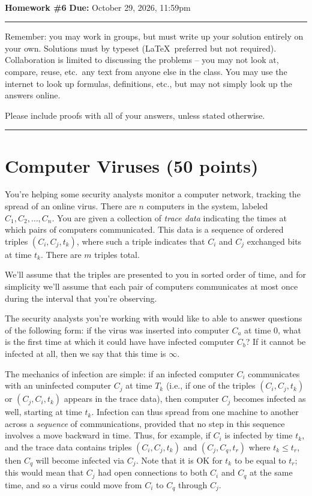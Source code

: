\documentclass[11pt]{article}
\begin{document}
\\ 
{{\bf Homework \#6}} \hfill {{\bf Due:} October 29, 2026, 11:59pm} \\
\rule[0.1in]{\textwidth}{0.4pt}

Remember: you may work in groups, but must write up your solution entirely on your own.  Solutions must by typeset (\LaTeX\ preferred but not required).  Collaboration is limited to discussing the problems -- you may not look at, compare, reuse, etc.~any text from anyone else in the class.  You may use the internet to look up formulas, definitions, etc., but may not simply look up the answers online.  

Please include proofs with all of your answers, unless stated otherwise.

\noindent \rule[0.1in]{\textwidth}{0.4pt}

\section{Computer Viruses (50 points)}
    You're helping some security analysts monitor a computer network, tracking the spread of an online virus.
    There are $n$ computers in the system, labeled $C_1, C_2, \dots, C_n$.  You are given a collection of
    \emph{trace data} indicating the times at which pairs of computers communicated.  This data is a 
    sequence of ordered triples $(C_i, C_j, t_k)$, where such a triple indicates that $C_i$ and $C_j$
    exchanged bits at time $t_k$.  There are $m$ triples total.

    We'll assume that the triples are presented to you in sorted order of time, and for simplicity we'll 
    assume that each pair of computers communicates at most once during the interval that you're observing.  

    The security analysts you're working with would like to able to answer questions of the following form:
    if the virus was inserted into computer $C_a$ at time $0$, what is the first time at which it could have
    have infected computer $C_b$?  If it cannot be infected at all, then we say that this time is $\infty$.  

    The mechanics of infection are simple: if an infected computer $C_i$ communicates with an uninfected
    computer $C_j$ at time $T_k$ (i.e., if one of the triples $(C_i, C_j, t_k)$ or $(C_j, C_i, t_k)$ appears
    in the trace data), then computer $C_j$ becomes infected as well, starting at time $t_k$.  Infection can
    thus spread from one machine to another across a \emph{sequence} of communications, provided that no step
    in this sequence involves a move backward in time.  Thus, for example, if $C_i$ is infected by time $t_k$,
    and the trace data contains triples $(C_i, C_j, t_k)$ and $(C_j, C_q, t_r)$ where $t_k \leq t_r$, then
    $C_q$ will become infected via $C_j$.  Note that it is OK for $t_k$ to be equal to $t_r$; this would mean
    that $C_j$ had open connections to both $C_i$ and $C_q$ at the same time, and so a virus could move from
    $C_i$ to $C_q$ through $C_j$.  
\end{document}
